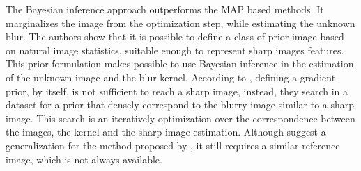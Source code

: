 \documentclass[conference,compsoc]{IEEEtran}
\begin{document}
The Bayesian inference approach \cite{Levin} outperforms the MAP based methods. It marginalizes
the image from the optimization step, while estimating the unknown blur.
The authors show that it is possible to define a class of prior image
based on natural image statistics, suitable enough to represent sharp images features.
This prior formulation makes possible to use Bayesian inference in the estimation of the
unknown image and the blur kernel. According to \cite{Hacohen13}, defining a gradient
prior, by itself, is not sufficient to reach a sharp image, instead,
they search in a dataset for a prior that densely correspond to
the blurry image similar to a sharp image. This search is an
iteratively optimization over the correspondence between the images, the kernel and
the sharp image estimation. Although \cite{Pan2014} suggest a generalization
for the method proposed by \cite{Hacohen13}, it still requires a similar reference image,
which is not always available.
\end{document}
